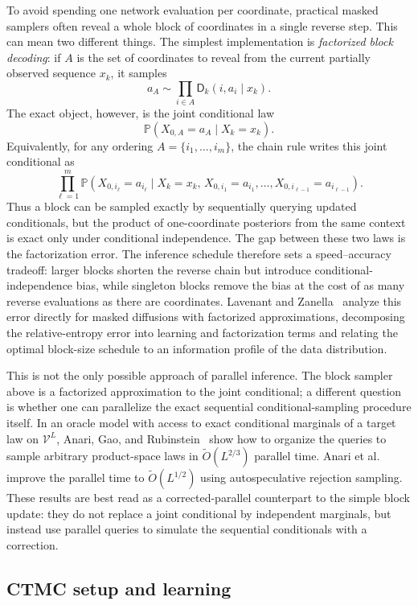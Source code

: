 \documentclass[10pt,a4paper]{amsart}
\numberwithin{equation}{section}
\newcommand{\Pp}{\mathbb{P}}
\newcommand{\mc}[1]{\mathcal{#1}}
\newcommand{\denoiser}{\mathsf{D}}
\newcommand{\tO}{\widetilde O}
\begin{document}
To avoid spending one network evaluation per coordinate, practical masked
samplers often reveal a whole block of coordinates in a single reverse step.
This can mean two different things.  The simplest implementation is
\emph{factorized block decoding}: if $A$ is the set of coordinates to reveal from
the current partially observed sequence $x_k$, it samples
\[
    a_A\sim \prod_{i\in A}\denoiser_k(i,a_i\mid x_k).
\]
The exact object, however, is the joint conditional law
\[
    \Pp(X_{0,A}=a_A\mid X_k=x_k).
\]
Equivalently, for any ordering $A=\{i_1,\ldots,i_m\}$, the chain rule writes this
joint conditional as
\[
    \prod_{\ell=1}^{m}
    \Pp\!\left(
    X_{0,i_\ell}=a_{i_\ell}
    \mid
    X_k=x_k,\,
    X_{0,i_1}=a_{i_1},\ldots,X_{0,i_{\ell-1}}=a_{i_{\ell-1}}
    \right).
\]
Thus a block can be sampled exactly by sequentially querying updated
conditionals, but the product of one-coordinate posteriors from the same context
is exact only under conditional independence.  The gap between these two laws is
the factorization error.  The inference schedule therefore sets a
speed--accuracy tradeoff: larger blocks shorten the reverse chain but introduce
conditional-independence bias, while singleton blocks remove the bias at the cost
of as many reverse evaluations as there are coordinates.  Lavenant and
Zanella~\cite{lavenant2025masked} analyze this error directly for masked
diffusions with factorized approximations, decomposing the relative-entropy error
into learning and factorization terms and relating the optimal block-size
schedule to an information profile of the data distribution.

This is not the only possible approach of parallel inference.  The block
sampler above is a factorized approximation to the joint conditional; a
different question is whether one can parallelize the exact sequential
conditional-sampling procedure itself.  In an oracle model with access to exact
conditional marginals of a target law on $\mc{V}^L$, Anari, Gao, and
Rubinstein~\cite{anari2024parallelcounting} show how to organize the queries to
sample arbitrary product-space laws in $\tO(L^{2/3})$ parallel time.
Anari et al.~\cite{anari2025autospeculation} improve the parallel time to
$\tO(L^{1/2})$ using autospeculative rejection sampling.  These results are best
read as a corrected-parallel counterpart to the simple block update: they do not
replace a joint conditional by independent marginals, but instead use parallel
queries to simulate the sequential conditionals with a correction.

\subsection{CTMC setup and learning}
\label{subsec:ctmc-setup-learning}
\end{document}
